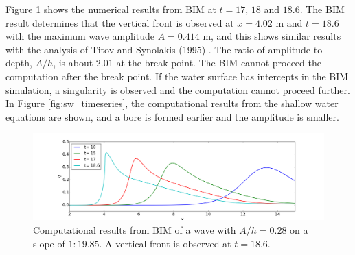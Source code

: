 \documentclass[review]{elsarticle}
\begin{document}
Figure \ref{fig:bim_breaking} shows
the numerical results from BIM at $t=17$, $18$ and  $18.6$.
The BIM result determines that 
the vertical front is observed at $x=4.02$ m and $t=18.6$
with the maximum wave amplitude $A=0.414$ m,
and this shows similar results with 
the analysis of Titov and Synolakis (1995) \cite{titov1995modeling}. 
The ratio of amplitude to depth, $A/h$, 
is about $2.01$ at the break point.
The BIM cannot proceed the computation after the break point.
If the water surface has intercepts in the BIM simulation,
a singularity is observed and the computation cannot
proceed further.
In Figure \ref{fig:sw_timeseries}, 
the computational results from the shallow water equations are shown,
and a bore is formed earlier and the amplitude is smaller. 

\begin{figure}[!htb]
\centering
\includegraphics[width=\textwidth]{_fig/bim_n7_time_series.png}
\caption{Computational results from BIM of a wave with $A/h=0.28$ 
on a slope of $1:19.85$.
A vertical front is observed at $t=18.6$. }
\label{fig:bim_breaking}
\end{figure}



\end{document}
